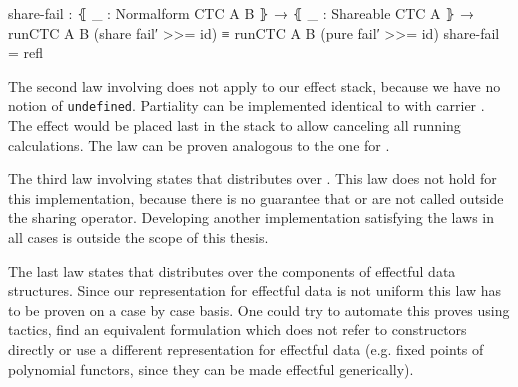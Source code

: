 \begin{code}
share-fail : ⦃ _ : Normalform CTC A B ⦄ → ⦃ _ : Shareable CTC A ⦄ →
  runCTC {A} {B} (share fail′ >>= id) ≡ runCTC {A} {B} (pure fail′ >>= id)
share-fail = refl
\end{code}
The second law involving  does not apply to our effect
stack, because we have no notion of \texttt{undefined}.
Partiality can be implemented identical to  with carrier
.
The effect would be placed last in the stack to allow canceling all running
calculations.
The law can be proven analogous to the one for .

The third law involving  states that 
distributes over .
This law does not hold for this implementation, because there is no guarantee
that  or  are not called outside the sharing
operator.
Developing another implementation satisfying the laws in all cases is outside
the scope of this thesis.

The last law states that  distributes over the components of
effectful data structures.
Since our representation for effectful data is not uniform this law has to be
proven on a case by case basis.
One could try to automate this proves using tactics, find an equivalent
formulation which does not refer to constructors directly or use a different
representation for effectful data (e.g. fixed points of polynomial functors,
since they can be made effectful generically).
